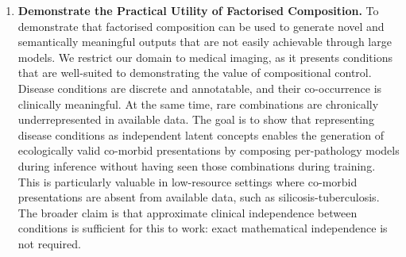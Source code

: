 \begin{enumerate}
    \item \textbf{Demonstrate the Practical Utility of Factorised Composition.}
    To demonstrate that factorised composition can be used to generate novel and
    semantically meaningful outputs that are not easily achievable through large models.
    We restrict our domain to medical imaging, as it presents conditions that are
    well-suited to demonstrating the value of compositional control.
    Disease conditions are discrete and annotatable, and their co-occurrence is
    clinically meaningful.
    At the same time, rare combinations are chronically underrepresented in
    available data.
    The goal is to show that representing disease conditions as independent latent
    concepts enables the generation of ecologically valid co-morbid presentations by
    composing per-pathology models during inference without having seen those
    combinations during training.
    This is particularly valuable in low-resource settings where co-morbid presentations
    are absent from available data, such as silicosis-tuberculosis.
    The broader claim is that approximate clinical independence between conditions is
    sufficient for this to work: exact mathematical independence is not required.

\end{enumerate}
